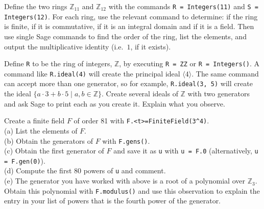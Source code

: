 \begin{sageverbatim}\end{sageverbatim}
%
%
Define the two rings ${\mathbb Z}_{11}$ and ${\mathbb Z}_{12}$ with the commands \verb?R = Integers(11)? and \verb?S = Integers(12)?.  For each ring, use the relevant command to determine:  if the ring is finite, if it is commutative, if it is an integral domain and if it is a field.  Then use single Sage commands to find the order of the ring, list the elements, and output the multiplicative identity (i.e.\ $1$, if it exists).
\begin{sageverbatim}\end{sageverbatim}
%
%
Define \verb?R? to be the ring of integers, ${\mathbb Z}$, by executing \verb?R = ZZ? or \verb?R = Integers()?.  A command like \verb?R.ideal(4)? will create the principal ideal $\langle 4\rangle$.  The same command can accept more than one generator, so for example, \verb?R.ideal(3, 5)? will create the ideal $\{a\cdot 3+ b\cdot 5\mid a,b\in{\mathbb Z}\}$.  Create several ideals of ${\mathbb Z}$ with two generators and ask Sage to print each as you create it.  Explain what you observe.
\begin{sageverbatim}\end{sageverbatim}
%
%
Create a finite field $F$ of order 81 with \verb?F.<t>=FiniteField(3^4)?.\\
(a) List the elements of $F$. \\
(b) Obtain the generators of $F$ with \verb?F.gens()?. \\
(c) Obtain the first generator of $F$ and save it as \verb?u? with \verb?u = F.0? (alternatively, \verb?u = F.gen(0)?). \\
(d) Compute the first 80 powers of \verb?u? and comment. \\
(e) The generator you have worked with above is a root of a polynomial over ${\mathbb Z}_3$.  Obtain this polynomial with \verb?F.modulus()? and use this observation to explain the entry in your list of powers that is the fourth power of the generator.
\begin{sageverbatim}\end{sageverbatim}
%
%
